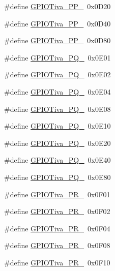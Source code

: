 \begin{DoxyCompactItemize}
\#define \hyperlink{_g_p_i_o_tiva_8h_aea63bdf76c20208ad5a483edbbd035a1}{G\+P\+I\+O\+Tiva\+\_\+\+P\+P\+\_}~0x0\+D20
\item 
\#define \hyperlink{_g_p_i_o_tiva_8h_a480e472a59b258b9be46c67f4c6b462e}{G\+P\+I\+O\+Tiva\+\_\+\+P\+P\+\_}~0x0\+D40
\item 
\#define \hyperlink{_g_p_i_o_tiva_8h_aa154815c4c5316d018942001ca60c64a}{G\+P\+I\+O\+Tiva\+\_\+\+P\+P\+\_}~0x0\+D80
\item 
\#define \hyperlink{_g_p_i_o_tiva_8h_a3f76535d287fd4d64e738bd2b0b53a68}{G\+P\+I\+O\+Tiva\+\_\+\+P\+Q\+\_}~0x0\+E01
\item 
\#define \hyperlink{_g_p_i_o_tiva_8h_a7cf6b8080d95737c2c27ec861f42923d}{G\+P\+I\+O\+Tiva\+\_\+\+P\+Q\+\_}~0x0\+E02
\item 
\#define \hyperlink{_g_p_i_o_tiva_8h_a88e00d3045e4e2d431874d7f2ecbb15b}{G\+P\+I\+O\+Tiva\+\_\+\+P\+Q\+\_}~0x0\+E04
\item 
\#define \hyperlink{_g_p_i_o_tiva_8h_aa3807139fb1f67bea56f24ffcfe6dc2a}{G\+P\+I\+O\+Tiva\+\_\+\+P\+Q\+\_}~0x0\+E08
\item 
\#define \hyperlink{_g_p_i_o_tiva_8h_a71fd78c42276ff78dfce5b91dc0dd62f}{G\+P\+I\+O\+Tiva\+\_\+\+P\+Q\+\_}~0x0\+E10
\item 
\#define \hyperlink{_g_p_i_o_tiva_8h_afd703faf6b74bde41edad71a27aeb8b0}{G\+P\+I\+O\+Tiva\+\_\+\+P\+Q\+\_}~0x0\+E20
\item 
\#define \hyperlink{_g_p_i_o_tiva_8h_a191d59e55e4e68c7c9f5ce648780aa38}{G\+P\+I\+O\+Tiva\+\_\+\+P\+Q\+\_}~0x0\+E40
\item 
\#define \hyperlink{_g_p_i_o_tiva_8h_a152b43f3716ab70ea05703fd331b3c4c}{G\+P\+I\+O\+Tiva\+\_\+\+P\+Q\+\_}~0x0\+E80
\item 
\#define \hyperlink{_g_p_i_o_tiva_8h_ab2d7fc499e572c85fbdc9176c0303914}{G\+P\+I\+O\+Tiva\+\_\+\+P\+R\+\_}~0x0\+F01
\item 
\#define \hyperlink{_g_p_i_o_tiva_8h_a802743ff6c926023beb1b0231ac47d1d}{G\+P\+I\+O\+Tiva\+\_\+\+P\+R\+\_}~0x0\+F02
\item 
\#define \hyperlink{_g_p_i_o_tiva_8h_adc212df9d41d0a549017935a58feeabd}{G\+P\+I\+O\+Tiva\+\_\+\+P\+R\+\_}~0x0\+F04
\item 
\#define \hyperlink{_g_p_i_o_tiva_8h_a7e75b1ae1c834d4674467764f2d61f3d}{G\+P\+I\+O\+Tiva\+\_\+\+P\+R\+\_}~0x0\+F08
\item 
\#define \hyperlink{_g_p_i_o_tiva_8h_a2eedb149b65f1b619b8d5b5bd17d73de}{G\+P\+I\+O\+Tiva\+\_\+\+P\+R\+\_}~0x0\+F10
\item 

\end{DoxyCompactItemize}
